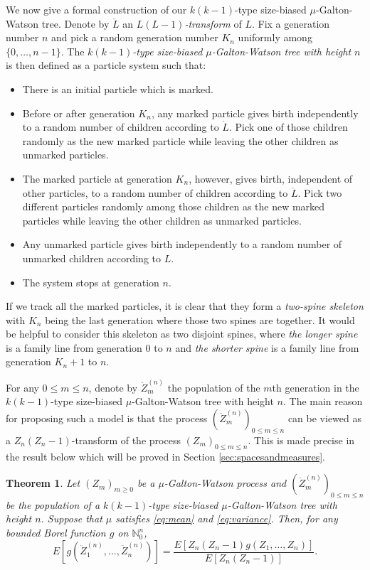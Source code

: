 \documentclass[12pt,a4paper]{amsart}
\newtheorem{thm}{Theorem}[section]
\numberwithin{equation}{section}
\begin{document}
	We now give a formal construction of our $k(k-1)$-type size-biased $\mu$-Galton-Watson tree.
	Denote by $\ddot L$ an \emph{$L(L-1)$-transform} of $L$.
	Fix a generation number $n$ and pick a random generation number $K_n$ uniformly among $\{0,\dots,n-1\}$.
	The \emph{$k(k-1)$-type size-biased $\mu$-Galton-Watson tree with height $n$} is then defined as a particle system such that:
\begin{itemize}
\item
	There is an initial particle which is marked.
\item
	Before or after generation $K_n$, any marked particle gives birth independently to a random number of children according to $\dot L$.
	Pick one of those children randomly as the new marked particle while leaving the other children as unmarked particles.
\item
	The marked particle at generation $K_n$, however, gives birth, independent of other particles, to a random number of children according to $\ddot L$.
	Pick two different particles randomly among those children as the new marked particles while leaving the other children as unmarked particles.
\item
	Any unmarked particle gives birth independently to a random number of unmarked children according to $L$.
\item
	The system stops at generation $n$.
\end{itemize}

	If we track all the marked particles, it is clear that they form a \emph{two-spine skeleton} with $K_n$ being the last generation where those two spines are together.
	It would be helpful to consider this skeleton as two disjoint spines,
	where \emph{the longer spine} is a family line from generation $0$ to $n$ and \emph{the shorter spine} is a family line from generation $K_n+1$ to $n$.
	
	For any $0\le m \le n$, denote by $\ddot Z_m^{(n)}$ the population of the $m$th generation in the $k(k-1)$-type size-biased $\mu$-Galton-Watson tree with height $n$.
	The main reason for proposing such a model is that the process $(\ddot Z_m^{(n)})_{0\le m\le n}$ can be viewed as
    a $Z_n(Z_n-1)$-transform of the process $(Z_m)_{0\le m\le n}$.
	This is made precise in the result below which will be proved in Section \ref{sec:spacesandmeasures}.
\begin{thm}
\label{thm: change of measure}
	Let $(Z_m)_{m\ge 0}$ be a $\mu$-Galton-Watson process and $(\ddot Z_m^{(n)})_{0\le m\le n}$ be the population of a $k(k-1)$-type size-biased $\mu$-Galton-Watson tree with height $n$.
	Suppose that $\mu$ satisfies \eqref{eq:mean} and \eqref{eq:variance}.
	Then, for any bounded Borel function $g$ on $\mathbb N^{n}_0$,
\[
		E[ g ( \ddot Z_1^{(n)}, \dots, \ddot Z_n^{(n)})]
	=
		\frac{ E[ Z_n(Z_n-1) g( Z_1, \dots, Z_n)]} {E [ Z_n ( Z_n - 1)]}.		
\]
\end{thm}
\end{document}

